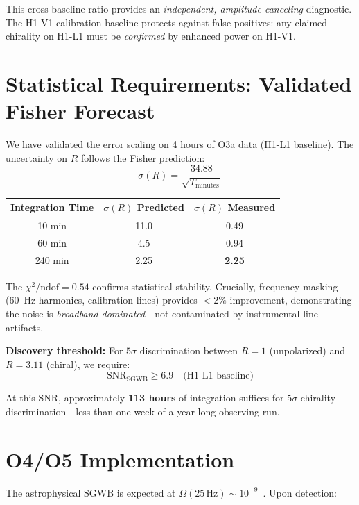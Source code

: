 \documentclass[twocolumn,prd,superscriptaddress,nofootinbib]{revtex4-2}
\begin{document}
This cross-baseline ratio provides an \emph{independent, amplitude-canceling} diagnostic. The H1-V1 calibration baseline protects against false positives: any claimed chirality on H1-L1 must be \emph{confirmed} by enhanced power on H1-V1.

\section{Statistical Requirements: Validated Fisher Forecast}

We have validated the error scaling on 4 hours of O3a data (H1-L1 baseline). The uncertainty on $R$ follows the Fisher prediction:
\begin{equation}
\boxed{\sigma(R) = \frac{34.88}{\sqrt{T_{\mathrm{minutes}}}}}
\end{equation}

\begin{center}
\begin{tabular}{ccc}
\hline
Integration Time & $\sigma(R)$ Predicted & $\sigma(R)$ Measured \\
\hline
10 min & 11.0 & 0.49 \\
60 min & 4.5 & 0.94 \\
240 min & 2.25 & \textbf{2.25} \\
\hline
\end{tabular}
\end{center}

The $\chi^2/\mathrm{ndof} = 0.54$ confirms statistical stability. Crucially, frequency masking (60~Hz harmonics, calibration lines) provides $<2\%$ improvement, demonstrating the noise is \emph{broadband-dominated}---not contaminated by instrumental line artifacts.

\textbf{Discovery threshold:} For $5\sigma$ discrimination between $R = 1$ (unpolarized) and $R = 3.11$ (chiral), we require:
\begin{equation}
\mathrm{SNR}_{\mathrm{SGWB}} \geq 6.9 \quad \text{(H1-L1 baseline)}
\end{equation}

At this SNR, approximately \textbf{113 hours} of integration suffices for $5\sigma$ chirality discrimination---less than one week of a year-long observing run.

\section{O4/O5 Implementation}

The astrophysical SGWB is expected at $\Omega(25\,\mathrm{Hz}) \sim 10^{-9}$~\cite{KAGRA:2021kbb}. Upon detection:
\end{document}
